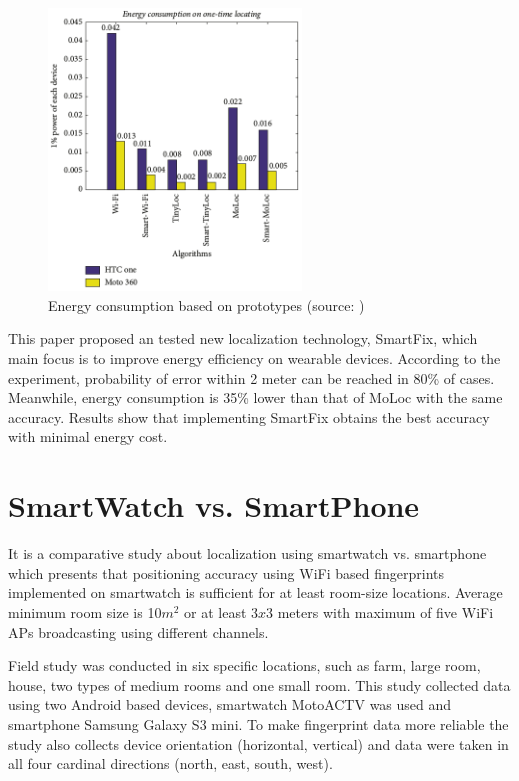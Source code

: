 \begin{figure}[H]
	\begin{centering}
		\includegraphics[width=0.6\textwidth]{img/smart_fix}
		\par\end{centering}
	\caption{Energy consumption based on prototypes (source: \cite{SmartFix})\label{fig:SmartFix}}
	\label{fig01c03}
\end{figure}

This paper proposed an tested new localization technology, SmartFix, which main focus is to improve energy efficiency on wearable devices. According to the experiment, probability of error within 2 meter can be reached in 80\% of cases. Meanwhile, energy consumption is 35\% lower than that of MoLoc with the same accuracy. Results show that implementing SmartFix obtains the best accuracy with minimal energy cost.

\section{SmartWatch vs. SmartPhone}\label{sec:SWvsSP}
It is a comparative study about localization using smartwatch vs. smartphone \cite{SWvsSP} which presents that positioning accuracy using WiFi based fingerprints implemented on smartwatch is sufficient for at least room-size locations. Average minimum room size is 10$m^2$ or at least 3$x$3 meters with maximum of five WiFi APs broadcasting using different channels.

Field study was conducted in six specific locations, such as farm, large room, house, two types of medium rooms and one small room. This study collected data using two Android based devices, smartwatch MotoACTV was used and smartphone Samsung Galaxy S3 mini. To make fingerprint data more reliable the study also collects device orientation (horizontal, vertical) and data were taken in all four cardinal directions (north, east, south, west).

